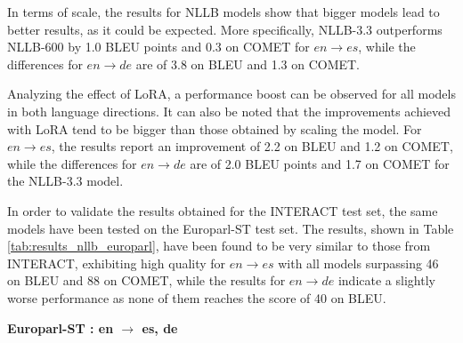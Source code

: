 \documentclass[11pt,english,listoffigures,listoftables]{tfgetsinf}
\begin{document}
In terms of scale, the results for NLLB models show that bigger models lead to better results, as it could be expected. More specifically, NLLB-3.3 outperforms NLLB-600 by 1.0 BLEU points and 0.3 on COMET for $en \rightarrow es$, while the differences for $en \rightarrow de$ are of 3.8 on BLEU and 1.3 on COMET.

Analyzing the effect of LoRA, a performance boost can be observed for all models in both language directions. It can also be noted that the improvements achieved with LoRA tend to be bigger than those obtained by scaling the model. For $en \rightarrow es$, the results report an improvement of 2.2 on BLEU and 1.2 on COMET, while the differences for $en \rightarrow de $ are of 2.0 BLEU points and 1.7 on COMET for the NLLB-3.3 model. 

In order to validate the results obtained for the INTERACT test set, the same models have been tested on the Europarl-ST test set. The results, shown in Table \ref{tab:results_nllb_europarl}, have been found to be very similar to those from INTERACT, exhibiting high quality for $en \rightarrow es$ with all models surpassing 46 on BLEU and 88 on COMET, while the results for $en \rightarrow de$ indicate a slightly worse performance as none of them reaches the score of 40 on BLEU. 

\begin{table}[h]
    \centering
    \caption{BLEU and COMET scores for encoder-decoder models on Europarl-ST test set}
    \label{tab:results_nllb_europarl}
    \textbf{Europarl-ST : en $\rightarrow$ es, de \\}
\end{table}
\end{document}
